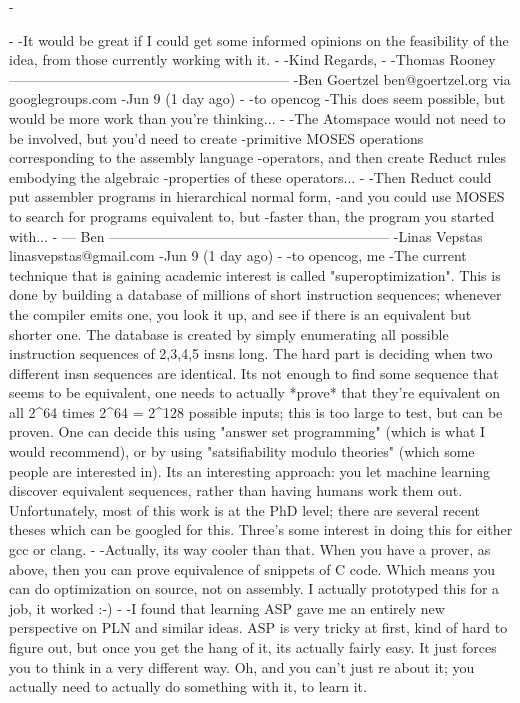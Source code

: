 -\documentclass[11pt]{article}
\begin{document}
-
-It would be great if I could get some informed opinions on the feasibility of the idea, from those currently working with it.
-
-Kind Regards,
-
-Thomas Rooney
------------------------------------------------------------
-Ben Goertzel ben@goertzel.org via googlegroups.com 
-Jun 9 (1 day ago)
-
-to opencog 
-This does seem possible, but would be more work than you're thinking...
-
-The Atomspace would not need to be involved, but you'd need to create
-primitive MOSES operations corresponding to the assembly language
-operators, and then create Reduct rules embodying the algebraic
-properties of these operators...
-
-Then Reduct could put assembler programs in hierarchical normal form,
-and you could use MOSES to search for programs equivalent to, but
-faster than, the program you started with...
-
--- Ben
------------------------------------------------------------
-Linas Vepstas linasvepstas@gmail.com
-Jun 9 (1 day ago)
-
-to opencog, me 
-The current technique that is gaining academic interest is called "superoptimization".    This is done by building a database of millions of short instruction sequences; whenever the compiler emits one, you look it up, and see if there is an equivalent but shorter one.  The database is created by simply enumerating all possible instruction sequences of 2,3,4,5 insns long.  The hard part is deciding when two different insn sequences are identical.  Its not enough to find some sequence that seems to be equivalent, one needs to actually *prove* that they're equivalent on all 2^64 times 2^64 = 2^128 possible inputs; this is too large to test, but can be proven.   One can decide this using "answer set programming" (which is what I would recommend), or by using "satsifiability modulo theories" (which some people are interested in).   Its an interesting approach: you let machine learning discover equivalent sequences, rather than having humans work them out.  Unfortunately, most of this work is at the PhD level; there are several recent theses which can be googled for this.   Three's some interest in doing this for either gcc or clang.
-
-Actually, its way cooler than that. When you have a prover, as above, then you can prove equivalence of snippets of C code.  Which means you can do optimization on source, not on assembly.  I actually prototyped this for a job, it worked :-)
-
-I found that learning ASP gave me an entirely new perspective on PLN and similar ideas.   ASP is very tricky at first, kind of hard to figure out, but once you get the hang of it, its actually fairly easy.  It just forces you to think in a very different way.  Oh, and you can't just re about it; you actually need to actually do something with it, to learn it.
\end{document}
